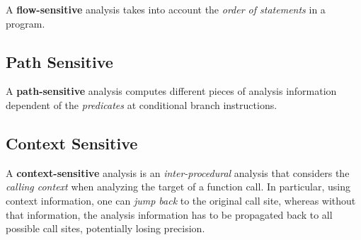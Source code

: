 A \textbf{flow-sensitive} analysis takes into account the
\textit{order of statements} in a program.

\subsection{Path Sensitive}
\label{sec:path-sensitive}

A \textbf{path-sensitive} analysis computes different pieces of
analysis information dependent of the \textit{predicates} at
conditional branch instructions.

\subsection{Context Sensitive}
\label{sec:context-sensitive}

A \textbf{context-sensitive} analysis is an \textit{inter-procedural}
analysis that considers the \textit{calling context} when analyzing
the target of a function call. In particular, using context
information, one can \textit{jump back} to the original call site,
whereas without that information, the analysis information has to be
propagated back to all possible call sites, potentially losing
precision.
